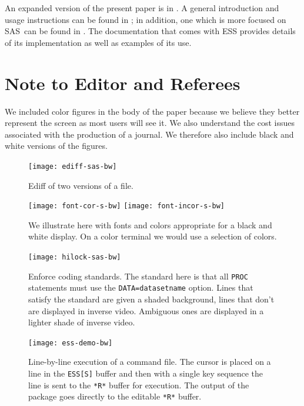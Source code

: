 \documentclass{article}
\newif\ifdraft
\newcommand*{\SAS}{\textsc{SAS}}
\newcommand{\stexttt}[1]{{\small\texttt{#1}}}
\newcommand{\emptyfig}{
\hspace*{42pt}\rule{324pt}{.25pt}\\
\hspace*{42pt}\rule{.25pt}{10pc}
\rule{316pt}{.25pt}
\rule{.25pt}{10pc}}
\begin{document}
An expanded version of the present paper is in \citep{RMHHS:2001}.  A
general introduction and usage instructions can be found in
\citep{heiberger:dsc:2001}; in addition, one which is more focused on
\SAS\ can be found in \citep{heiberger:philasugi:2001}.  The
documentation that comes with ESS provides details of its
implementation as well as examples of its use.


\newpage
\section*{Note to Editor and Referees}
We included color figures in the body of the paper because we believe
they better represent the screen as most users will see it.  We also
understand the cost issues associated with the production of a
journal.  We therefore also include black and white versions of the
figures.

\setcounter{figure}{0}
\begin{figure}[tbp]
  \centering
  \ifdraft
     \emptyfig
  \else
     \texttt{[image: ediff-sas-bw]}
  \fi
  \caption{Ediff of two versions of a file.}
\end{figure}


\begin{figure}[tbp]%
  \centering
\ifdraft
  \emptyfig
\else
  \texttt{[image: font-cor-s-bw]}
  \texttt{[image: font-incor-s-bw]}
\fi
  \caption{We illustrate here with fonts and colors appropriate for a
    black and white display.   On a color terminal we
    would use a selection of colors.}
\end{figure}

\begin{figure}[tbp]
  \centering
  \ifdraft
     \emptyfig
  \else
     \texttt{[image: hilock-sas-bw]}
  \fi
  \caption{Enforce coding standards.  The standard here is
    that all \stexttt{PROC} statements must use the
    \stexttt{DATA=datasetname} option.  Lines that satisfy the
    standard are given a shaded background, lines that don't are displayed
    in inverse video.
    Ambiguous ones are displayed in a lighter shade of inverse video.}
\end{figure}

\begin{figure}[tb]
  \centering
  \ifdraft
     \emptyfig
  \else
     \texttt{[image: ess-demo-bw]}
  \fi
  \caption{Line-by-line execution of a command file. The cursor is
    placed on a line in the \stexttt{ESS[S]} buffer and then with a single
    key sequence
    the line is sent to the \stexttt{*R*} buffer for
    execution.  The output of the package goes directly to the
    editable \stexttt{*R*} buffer.}
\end{figure}
\end{document}
